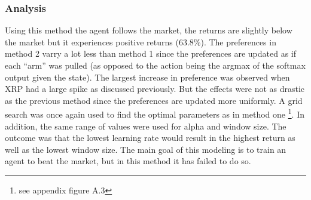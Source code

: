 \documentclass[a4paper,12pt]{article}
\begin{document}
\subsubsection{Analysis}
Using this method the agent follows the market, the returns are slightly below the market but it experiences positive returns (63.8\%). The preferences in method 2 varry a lot less than method 1 since the preferences are updated as if each “arm” was pulled (as opposed to the action being the argmax of the softmax output given the state). The largest increase in preference was observed when XRP had a large spike as discussed previously. But the effects were not as drastic as the previous method since the preferences are updated more uniformly.
A grid search was once again used to find the optimal parameters as in method one \footnote{see appendix figure A.3}. In addition, the same range of values were used for alpha and window size. The outcome was that the lowest learning rate would result in the highest return as well as the lowest window size. 
The main goal of this modeling is to train an agent to beat the market, but in this method it has failed to do so. 
\end{document}
